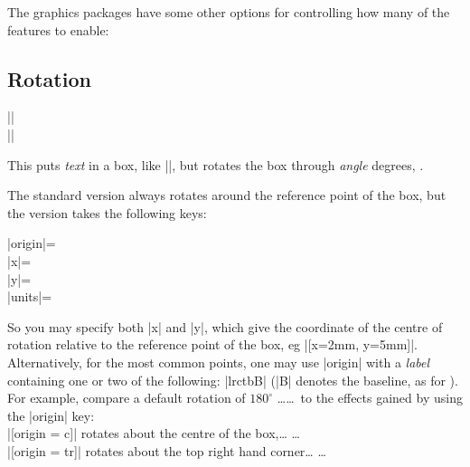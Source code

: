 The graphics packages have some other options for controlling how many
of the features to enable:
\subsection{Rotation}

\begin{decl}
\gs |\rotatebox|\\
\gx |\rotatebox|
\end{decl}

This puts \emph{text} in a box, like |\mbox|, but rotates the box
through \emph{angle} degrees, .

The standard version always rotates around the reference point of the
box, but the  version takes the following keys:

\begin{decl}
|origin|=\\
|x|=\\
|y|=\\
|units|=
\end{decl}

So you may specify both |x| and |y|, which give the coordinate of
the centre of rotation relative to the reference point of the box, eg
|[x=2mm, y=5mm]|. Alternatively, for the most common points, one may use
|origin| with a \emph{label} containing one or two of the following:
|lrctbB| (|B| denotes the baseline, as for ). For
example, compare a default rotation of $180^\circ$
\ldots{}\ldots\ to the effects gained by using
the |origin| key:\\
|[origin = c]| rotates about the centre of the box,\ldots
         \ldots\\
|[origin = tr]| rotates about the top right hand corner\ldots
                   \ldots

